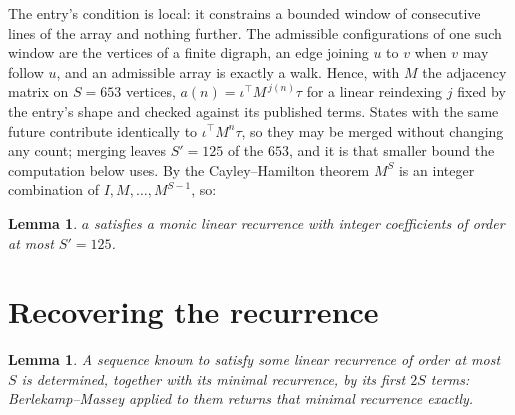 \documentclass[11pt,a4paper]{article}
\theoremstyle{plain}
\newtheorem{lemma}[theorem]{Lemma}
\theoremstyle{definition}
\begin{document}
The entry's condition is local: it constrains a bounded window of consecutive lines of the
array and nothing further. The admissible configurations of one such window are the vertices
of a finite digraph, an edge joining $u$ to $v$ when $v$ may follow $u$, and an admissible
array is exactly a walk. Hence, with $M$ the adjacency matrix on $S=653$ vertices,
$a(n)=\iota^{\!\top}M^{\,j(n)}\tau$ for a linear reindexing $j$ fixed by the entry's shape
and checked against its published terms. States with the same future contribute identically to $\iota^{\!\top}M^n\tau$, so they may be merged without changing any count; merging leaves $S'=125$ of the $653$, and it is that smaller bound the computation below uses. By the Cayley--Hamilton theorem $M^{S}$ is an
integer combination of $I,M,\dots,M^{S-1}$, so:

\begin{lemma}\label{lem:cf}
$a$ satisfies a monic linear recurrence with integer coefficients of order at most
$S'=125$.
\end{lemma}

\section{Recovering the recurrence}

\begin{lemma}\label{lem:bm}
A sequence known to satisfy some linear recurrence of order at most $S$ is determined, together
with its minimal recurrence, by its first $2S$ terms: Berlekamp--Massey applied to them returns
that minimal recurrence exactly.
\end{lemma}
\end{document}

